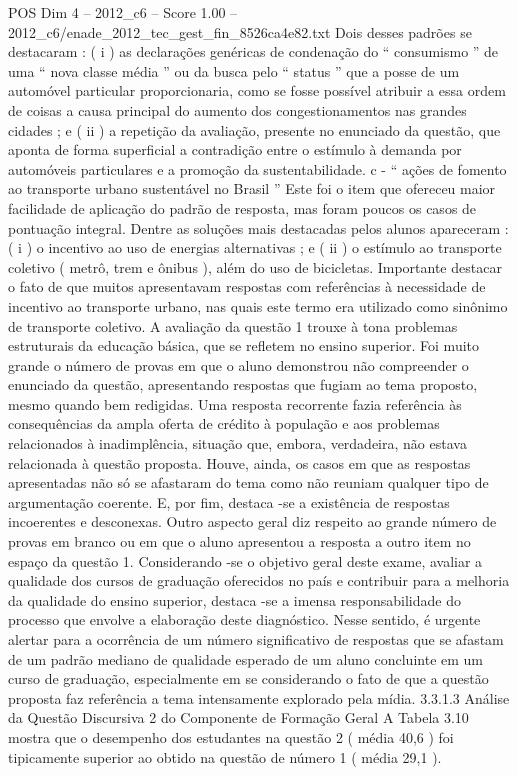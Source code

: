 \begin{textsample}{POS Dim 4 – 2012\_c6 – Score 1.00 – 2012\_c6/enade\_2012\_tec\_gest\_fin\_8526ca4e82.txt}
Dois desses padrões se destacaram : ( i ) as declarações genéricas de condenação do “ consumismo ” de uma “ nova classe média ” ou da busca pelo “ status ” que a posse de um automóvel particular proporcionaria, como se fosse possível atribuir a essa ordem de coisas a causa principal do aumento dos congestionamentos nas grandes cidades ; e ( ii ) a repetição da avaliação, presente no enunciado da questão, que aponta de forma superficial a contradição entre o estímulo à demanda por automóveis particulares e a promoção da sustentabilidade. c - “ ações de fomento ao transporte urbano sustentável no Brasil ” Este foi o item que ofereceu maior facilidade de aplicação do padrão de resposta, mas foram poucos os casos de pontuação integral.
Dentre as soluções mais destacadas pelos alunos apareceram : ( i ) o incentivo ao uso de energias alternativas ; e ( ii ) o estímulo ao transporte coletivo ( metrô, trem e ônibus ), além do uso de bicicletas.
Importante destacar o fato de que muitos apresentavam respostas com referências à necessidade de incentivo ao transporte urbano, nas quais este termo era utilizado como sinônimo de transporte coletivo.
A avaliação da questão 1 trouxe à tona problemas estruturais da educação básica, que se refletem no ensino superior.
Foi muito grande o número de provas em que o aluno demonstrou não compreender o enunciado da questão, apresentando respostas que fugiam ao tema proposto, mesmo quando bem redigidas.
Uma resposta recorrente fazia referência às consequências da ampla oferta de crédito à população e aos problemas relacionados à inadimplência, situação que, embora, verdadeira, não estava relacionada à questão proposta.
Houve, ainda, os casos em que as respostas apresentadas não só se afastaram do tema como não reuniam qualquer tipo de argumentação coerente.
E, por fim, destaca -se a existência de respostas incoerentes e desconexas.
Outro aspecto geral diz respeito ao grande número de provas em branco ou em que o aluno apresentou a resposta a outro item no espaço da questão 1.
Considerando -se o objetivo geral deste exame, avaliar a qualidade dos cursos de graduação oferecidos no país e contribuir para a melhoria da qualidade do ensino superior, destaca -se a imensa responsabilidade do processo que envolve a elaboração deste diagnóstico.
Nesse sentido, é urgente alertar para a ocorrência de um número significativo de respostas que se afastam de um padrão mediano de qualidade esperado de um aluno concluinte em um curso de graduação, especialmente em se considerando o fato de que a questão proposta faz referência a tema intensamente explorado pela mídia. 3.3.1.3 Análise da Questão Discursiva 2 do Componente de Formação Geral A Tabela 3.10 mostra que o desempenho dos estudantes na questão 2 ( média 40,6 ) foi tipicamente superior ao obtido na questão de número 1 ( média 29,1 ).

\end{textsample}
